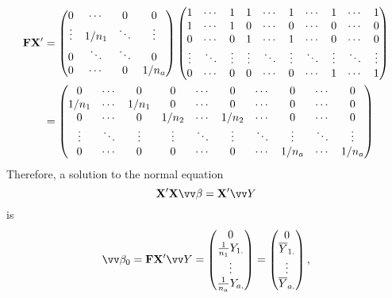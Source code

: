 \begin{align*}
    \mathbf{F}\mathbf{X}'
     & =\begin{pmatrix}
            0      & \cdots & 0      & 0      \\
            \vdots & 1/n_1  & \ddots & \vdots \\
            0      & \ddots & \ddots & 0      \\
            0      & \cdots & 0      & 1/n_a
        \end{pmatrix}\begin{pmatrix}
                         1      & \cdots & 1      & 1      & \cdots & 1      & \cdots & 1      & \cdots & 1      \\
                         1      & \cdots & 1      & 0      & \cdots & 0      & \cdots & 0      & \cdots & 0      \\
                         0      & \cdots & 0      & 1      & \cdots & 1      & \cdots & 0      & \cdots & 0      \\
                         \vdots & \ddots & \vdots & \vdots & \ddots & \vdots & \ddots & \vdots & \ddots & \vdots \\
                         0      & \cdots & 0      & 0      & \cdots & 0      & \cdots & 1      & \cdots & 1
                     \end{pmatrix} \\
     & =\begin{pmatrix}
            0      & \cdots & 0      & 0      & \cdots & 0      & \cdots & 0      & \cdots & 0      \\
            1/n_1  & \cdots & 1/n_1  & 0      & \cdots & 0      & \cdots & 0      & \cdots & 0      \\
            0      & \cdots & 0      & 1/n_2  & \cdots & 1/n_2  & \cdots & 0      & \cdots & 0      \\
            \vdots & \ddots & \vdots & \vdots & \ddots & \vdots & \ddots & \vdots & \ddots & \vdots \\
            0      & \cdots & 0      & 0      & \cdots & 0      & \cdots & 1/n_a  & \cdots & 1/n_a
        \end{pmatrix}
\end{align*}
Therefore, a solution to the normal equation
\[ \Matrix{X}'\Matrix{X}\Vector{\beta}=\Matrix{X}'\Vector{Y} \]
is
\[ \Vector{\beta}_0=\Matrix{F}\Matrix{X}'\Vector{Y}=\begin{pmatrix}
        0                   \\
        \frac{1}{n_1}Y_{1.} \\
        \vdots              \\
        \frac{1}{n_a}Y_{a.}
    \end{pmatrix}=\begin{pmatrix}
        0            \\
        \bar{Y}_{1.} \\
        \vdots       \\
        \bar{Y}_{a.}
    \end{pmatrix}, \]
